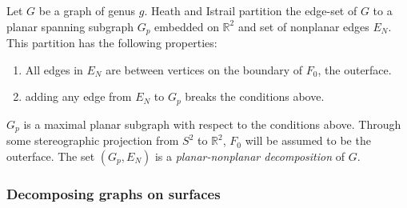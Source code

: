 Let $G$ be a graph of genus $g$. Heath and Istrail partition the edge-set of \(G\) to a planar spanning subgraph \(G_p\) embedded on $\mathbb{R}^2$ and set of nonplanar edges $E_N$. This partition has the following properties:
\begin{enumerate}
	\item All edges in \(E_N\) are between vertices on the boundary of $F_0$, the outerface.
	\item adding any edge from $E_N$ to \(G_p\) breaks the conditions above.
\end{enumerate}
$G_p$ is a maximal planar subgraph with respect to the conditions above. Through some stereographic projection from $S^2$ to $\mathbb{R}^2$, $F_0$ will be assumed to be the outerface. The set $(G_p, E_N)$ is a \textit{planar-nonplanar decomposition} of $G$. 



\subsubsection{Decomposing graphs on surfaces}\label{sssec:Planar_nonplanar_decomp}

